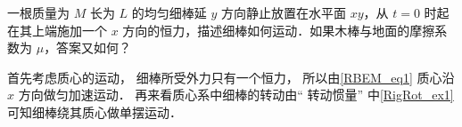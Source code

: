 \begin{exam}{}
一根质量为 $M$ 长为 $L$ 的均匀细棒延 $y$ 方向静止放置在水平面 $xy$，从 $t=0$ 时起在其上端施加一个 $x$ 方向的恒力，描述细棒如何运动．如果木棒与地面的摩擦系数为 $\mu$，答案又如何？

首先考虑质心的运动， 细棒所受外力只有一个恒力， 所以由\autoref{RBEM_eq1} 质心沿 $x$ 方向做匀加速运动． 再来看质心系中细棒的转动由“ 转动惯量” 中\autoref{RigRot_ex1} 可知细棒绕其质心做单摆运动．
\end{exam}

